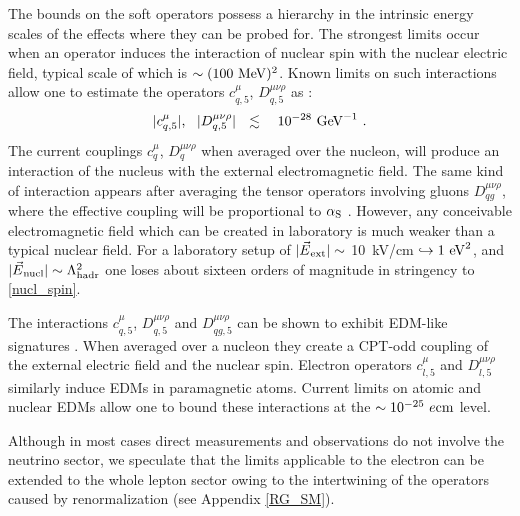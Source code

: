 \documentclass[12pt,preprintnumbers,nofootinbib]{revtex4}
\begin{document}
	The bounds on the soft operators possess a hierarchy in the 
	intrinsic energy scales of the effects where they can be probed for.
	The strongest limits occur when an operator induces the interaction 
	of nuclear spin with the nuclear electric field, typical scale of which
	is $ \sim (100~{\rm MeV})^2 $.
	Known limits on such interactions allow one to estimate the operators 
$ c^\mu_{q,5} $, $ D^{\mu\nu\rho}_{q,5} $ as
\cite{Bolokhov:2005cj}:
\begin{equation}
\label{nucl_spin}
	|c^\mu_{q,5}|,~~ |D^{\mu\nu\rho}_{q,5}| ~~\lesssim~~~
	10^{-28}~{\rm GeV}^{-1}~.
\end{equation}
	The current couplings $ c_q^\mu $, $ D^{\mu\nu\rho}_q $  when averaged over the nucleon, 
	will produce an interaction of the nucleus with the external electromagnetic field.
	The same kind of interaction appears after averaging the tensor operators
	involving gluons $ D^{\mu\nu\rho}_{qg} $, where the effective coupling will be
	proportional to $ \alpha_{\rm S} $ 
\cite{Manohar:1983md}.
	However, any conceivable electromagnetic field which can be created in laboratory
	is much weaker than a typical nuclear field.
	For a laboratory setup of $ |\vec{E}{}_{\rm ext}| \sim $ 10~kV/cm 
	$ \hookrightarrow 1~{\rm eV}^2 $, and 
	$ |\vec{E}{}_{\rm nucl}| \sim \Lambda_{\rm hadr}^2 $
	one loses about sixteen orders of magnitude in stringency to \eqref{nucl_spin}.
	
	The interactions $ c^\mu_{q,5} $, $ D^{\mu\nu\rho}_{q,5} $ and
	$ D^{\mu\nu\rho}_{qg,5} $ can be shown to exhibit EDM-like signatures
\cite{Bolokhov_EDM}.
	When averaged over a nucleon they create a CPT-odd coupling of the external electric 
	field and the nuclear spin. 
	Electron operators $ c_{l,5}^\mu $ and $ D_{l,5}^{\mu\nu\rho} $ similarly induce
	EDMs in paramagnetic atoms. 
	Current limits on atomic and nuclear EDMs allow one to bound these interactions
	at the $ \sim 10^{-25}~e{\rm cm} $ 
	level.
	

	Although in most cases direct measurements and observations do not involve 
	the neutrino sector, 
	we speculate that the limits applicable to the electron can be extended to
	the whole lepton sector owing to the intertwining of the operators caused by
	renormalization (see Appendix \ref{RG_SM}).
\end{document}
